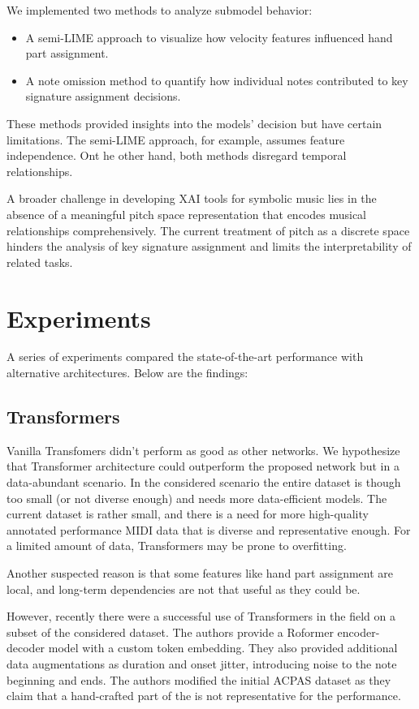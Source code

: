 We implemented two methods to analyze submodel behavior: \begin{itemize}
	\item A semi-LIME approach to visualize how velocity features influenced hand part assignment.
	\item A note omission method to quantify how individual notes contributed to key signature assignment decisions. \end{itemize}

These methods provided insights into the models' decision but have certain limitations. The semi-LIME approach, for example, assumes feature independence. Ont he other hand, both methods disregard temporal relationships.

A broader challenge in developing XAI tools for symbolic music lies in the absence of a meaningful pitch space representation that encodes musical relationships comprehensively. The current treatment of pitch as a discrete space hinders the analysis of key signature assignment and limits the interpretability of related tasks.

\section{Experiments}

A series of experiments compared the state-of-the-art performance with alternative architectures. Below are the findings:

\subsection{Transformers}

Vanilla Transfomers didn't perform as good as other networks. We hypothesize that Transformer architecture could outperform the proposed network but in a data-abundant scenario. In the considered scenario the entire dataset is though too small (or not diverse enough) and needs more data-efficient models. The current dataset is rather small, and there is a need for more high-quality annotated performance MIDI data that is diverse and representative enough. For a limited amount of data, Transformers may be prone to overfitting.

Another suspected reason is that some features like hand part assignment are local, and long-term dependencies are not that useful as they could be. 

However, recently there were a successful use of Transformers in the field \cite{Beyer2024} on a subset of the considered dataset. The authors provide a Roformer encoder-decoder model with a custom token embedding. They also provided additional data augmentations as duration and onset jitter, introducing noise to the note beginning and ends. The authors modified the initial ACPAS dataset as they claim that a hand-crafted part of the is not representative for the performance. 

